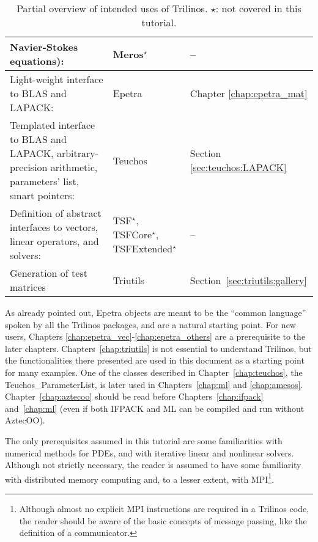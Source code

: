\begin{table}[htbp]
\begin{tabular}{| p{8cm} | p{2.5cm} | p{3cm} |}
    Navier-Stokes equations):& 
    Meros$^\star$ & -- \\
    \hline
    Light-weight interface to BLAS and LAPACK: & Epetra 
    & Chapter \ref{chap:epetra_mat} \\
    \hline
    Templated interface to BLAS and LAPACK, arbitrary-precision
    arithmetic, parameters' list, smart pointers:& Teuchos &
    Section \ref{sec:teuchos:LAPACK} \\
    \hline
    Definition of abstract interfaces to vectors, linear operators, and
    solvers:& TSF$^\star$, TSFCore$^\star$, TSFExtended$^\star$   & --
    \\
    \hline
    Generation of test matrices & Triutils & Section~\ref{sec:triutils:gallery} \\
    \hline
  \end{tabular}
  \caption{Partial overview of intended uses of  Trilinos. $\star$:
    not covered in this tutorial.}
  \label{tab:tripackages}
\end{table}

\begin{remark}
  As already pointed out, Epetra objects are meant to be the ``common
  language'' spoken by all the Trilinos packages, and are a natural
  starting point. For new users, Chapters
  \ref{chap:epetra_vec}-\ref{chap:epetra_others} are a prerequisite to
  the later chapters. Chapters~\ref{chap:triutils} is not essential to
  understand Trilinos, but the functionalities there presented are used
  in this document as a starting point for many examples.  One of the
  classes described in Chapter~\ref{chap:teuchos}, the
  Teuchos\_ParameterList, is later used in Chapters~\ref{chap:ml} and
  \ref{chap:amesos}.  Chapter~\ref{chap:aztecoo} should be read before
  Chapters~\ref{chap:ifpack} and~\ref{chap:ml} (even if both IFPACK and
  ML can be compiled and run without AztecOO).
\end{remark}

The only prerequisites assumed in this tutorial are some familiarities
with numerical methods for PDEs, and with iterative linear and nonlinear
solvers. Although not strictly necessary, the reader is assumed to have
some familiarity with distributed memory computing and, to a lesser
extent, with MPI\footnote{Although almost no explicit MPI instructions
  are required in a Trilinos code, the reader should be aware of the
  basic concepts of message passing, like the definition of a
  communicator.}.

\smallskip

